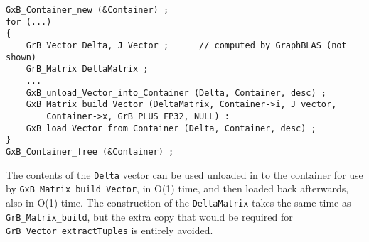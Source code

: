 {\footnotesize
\begin{verbatim}
GxB_Container_new (&Container) ;
for (...)
{
    GrB_Vector Delta, J_Vector ;      // computed by GraphBLAS (not shown)
    GrB_Matrix DeltaMatrix ;
    ...
    GxB_unload_Vector_into_Container (Delta, Container, desc) ;
    GxB_Matrix_build_Vector (DeltaMatrix, Container->i, J_vector,
        Container->x, GrB_PLUS_FP32, NULL) :
    GxB_load_Vector_from_Container (Delta, Container, desc) ;
}
GxB_Container_free (&Container) ;
\end{verbatim}}

The contents of the \verb'Delta' vector can be used unloaded in to the
container for use by \verb'GxB_Matrix_build_Vector', in O(1) time, and then
loaded back afterwards, also in O(1) time.  The construction of the
\verb'DeltaMatrix' takes the same time as \verb'GrB_Matrix_build', but the
extra copy that would be required for \verb'GrB_Vector_extractTuples' is
entirely avoided.

